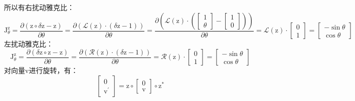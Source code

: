 \documentclass[12pt, onecolumn]{article}
\newcommand\bsm[1]{\boldsymbol{\mathrm{#1}}}
\begin{document}
	所以有右扰动雅克比：
	\begin{equation}
	\bsm{J}^{\bsm{z}}_{\theta}=\frac{\partial \left( \bsm{z}\circ\delta\bsm{z}-\bsm{z}\right) }{\partial \theta}
	=\frac{\partial \left( \mathcal{L}(\bsm{z})\cdot\left( \delta\bsm{z}-\bsm{1}\right) \right) }{\partial \theta}
	=\frac{\partial \left( \mathcal{L}(\bsm{z})\cdot\left( \begin{bmatrix}
	1\\\theta
	\end{bmatrix}-\begin{bmatrix}
		1\\0
		\end{bmatrix}\right) \right) }{\partial \theta}
	=\mathcal{L}(\bsm{z})\cdot\begin{bmatrix}
			0\\1
			\end{bmatrix}
	=\begin{bmatrix}
				-\sin\theta\\\cos\theta
				\end{bmatrix}
	\end{equation}
	左扰动雅克比：
	\begin{equation}
	\bsm{J}^{\bsm{z}}_{\theta}=\frac{\partial \left( \delta\bsm{z}\circ\bsm{z}-\bsm{z}\right) }{\partial \theta}
	=\frac{\partial \left( \mathcal{R}(\bsm{z})\cdot\left( \delta\bsm{z}-\bsm{1}\right) \right) }{\partial \theta}
	=\mathcal{R}(\bsm{z})\cdot\begin{bmatrix}
			0\\1
			\end{bmatrix}
	=\begin{bmatrix}
				-\sin\theta\\\cos\theta
				\end{bmatrix}
	\end{equation}
	对向量$\bsm{v}$进行旋转，有：
	\begin{equation}
	\begin{bmatrix}
	0\\\bsm{v}^\prime
	\end{bmatrix}=\bsm{z}\circ\begin{bmatrix}
	0\\\bsm{v}
	\end{bmatrix}\circ\bsm{z}^*
	\end{equation}
	
\end{document}
